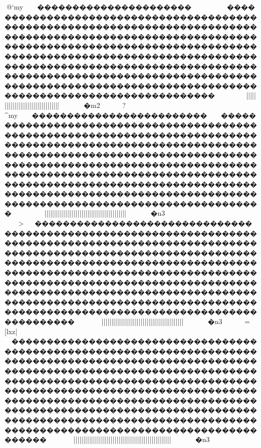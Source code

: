 {{{{{{{{{{{{{{{{{{{{{{{{{{{{{{{{{{{{{{{{{{{{{{{{{{{{{{{{{{{{{{{{{{{{{{{{{{{{{{{{{{{{{{{{{{{{{{{{{{{{{{{{{{{{{{{{{{{{{{{{{{{{{{{{{{{{{{{{{{{{{{{{{{{{{{{{{{{{{{{{{{{{{{{{{{{{{{{{{{{{{{{{{{{{{{{{{{{{{{{{{{{{{{{{{{{{{{{{{{{{{{{{{{{{{{{{{{{{{{{{{{{{{{{{{{{{{{{{{{{{{{{{{{{{{{{{{{{{{{{{{{{{{{{{{{{{{{{{{{{{{{{{{{{{{{{{{{{{{{{{{{{{{{{{{{{{{{{{{{{{{{{{{{{{{{{{{{{{{{{{{{{{{{{{{{{{{{{{{{{{{{{{{{{{{{{{{{{{{{{{{{{{{{{{{{{{{{{{{{{{{{{{{{{{{{{{{{{{{{{{{{{{{{{{{{{{{{{{{{{{{{{{{{{{{{{{{{{{{{{{{{{{{{{{{{{{{{{{{{{{{{{{{{{{{{{{{{{{{{{{{{{{{{{{{{{{{{{{{{{{{{{{{{{{{{{{{{{{{{{{{{{{{{{{{{{{{{{{{{{{{{{{{{{{{{{{{{{{{{{{{{@`my{}~~~~��������������������������������������������������������������������������������������������������������������������������������������������������������������������������������������������������������������������������������������������������������������������������������������������������������������������������������������������������������~~~~~||||||||||||{{{{{{{{{{{{{{{{{{{{{{{{{{{{{{||||{|||{{{{{{{{||||||||||||||}}}~~~~~~~�m2	
?^my{}~~~~�������������������������������������������������������������������������������������������������������������������������������������������������������������������������������������������������������������������������������������������������������������������������������������������������������������������������������������������������������������������~~~~~~||||||||||||||||||||||||||||||{{{{{{{{||||||||{{{{{{{{||||}}}}}}}}}}}}}}~~~�n3
>\my{}~~�����������������������������������������������������������������������������������������������������������������������������������������������������������������������������������������������������������������������������������������������������������������������������������������������������������������������������������������������������������������������������~~~~~~||||||||||||||||||||||||||||||{{{{{{{{||||||||{{{{{{{{||||}}}}}}}}}}}}}}~~~�n3

=[lxz|}}~~�����������������������������������������������������������������������������������������������������������������������������������������������������������������������������������������������������������������������������������������������������������������������������������������������������������������������������������������������������������������������������~~~~~~||||||||||||||||||||||||||||||||||||||||||||||{{{{{{{{||||}}}}}}}}}}}}}}~~~�n3

}}}}}}}}}}}}}}}}}}}}}}}}}}}}}}}}}}}}}}}}}}}}}}}}}}}}}}}}}}}}}}}}}}}}}}}}}}}}}}}}}}}}}}}}}}}}}}}}}}}}}}}}}}}}}}}}}}}}}}}}}}}}}}}}}}}}}}}}}}}}}}}}}}}}}}}}}}}}}}}}}}}}}}}}}}}}}}}}}}}}}}}}}}}}}}}}}}}}}}}}}}}}}}}}}}}}}}}}}}}}}}}}}}}}}}}}}}}}}}}}}}}}}}}}}}}}}}}}}}}}}}}}}}}}}}}}}}}}}}}}}}}}}}}}}}}}}}}}}}}}}}}}}}}}}}}}}}}}}}}}}}}}}}}}}}}}}}}}}}}}}}}}}}}}}}}}}}}}}}}}}}}}}}}}}}}}}}}}}}}}}}}}}}}}}}}}}}}}}}}}}}}}}}}}}}}}}}}}}}}}}}}}}}}}}}}}}}}}}}}}}}}}}}}}}}}}}}}}}}}}}}}}}}}}}}}}}}}}}}}}}}}}}}}}}}}}}}}}}}}}}}}}}}}}}}}}}}}}}}}}}}}}}}}}}}}}}}}}}}}}}}}}}}}}}}}}}}}}}}}}}}}}}}}}}}}}}}}}}}}}}}}}}}}}}}}}}}}}}}}}}}}}}}}}}}}}}}}}}}}}}}}}}}}}}}}}}}

